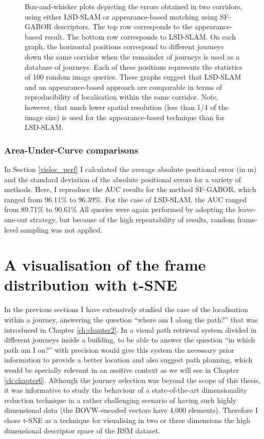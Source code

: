 \begin{figure}
\caption{Box-and-whisker plots depicting the errors obtained in two corridors, using either LSD-SLAM or appearance-based matching using SF-GABOR descriptors. The top row corresponds to the appearance-based result. The bottom row corresponds to LSD-SLAM. On each graph, the horizontal positions correspond to different journeys down the same corridor when the remainder of journeys is used as a database of journeys. Each of these positions represents the statistics of 100 random image queries. These graphs suggest that LSD-SLAM and an appearance-based approach are comparable in terms of reproducibility of localisation within the same corridor. Note, however, that much lower spatial resolution (less than 1/4 of the image size) is used for the appearance-based technique than for LSD-SLAM.}
\label{fig:reprod}
\end{figure}

\subsubsection{Area-Under-Curve comparisons}
In Section \ref{visloc_perf} I calculated the average absolute positional error (in m) and the standard deviation of the absolute positional errors for a variety of methods. Here, I reproduce the AUC results for the method SF-GABOR, which ranged from 96.11\% to 96.39\%. For the case of LSD-SLAM, the AUC ranged from 89.71\% to 90.61\% All queries were again performed by adopting the leave-one-out strategy, but because of the high repeatability of results, random frame-level sampling was not applied.  



\section{A visualisation of the frame distribution with t-SNE}

In the previous sections I have extensively studied the case of the localisation within a journey, answering the question ``where am I along the path?'' that was introduced in Chapter \ref{ch:chapter2}. In a visual path retrieval system divided in different journeys inside a building, to be able to answer the question ``in which path am I on?'' with precision would give this system the necessary prior information to provide a better location and also suggest path planning, which would be specially relevant in an assitive context as we will see in Chapter \ref{ch:chapter6}. Although the journey selection was beyond the scope of this thesis, it was informative to study the behaviour of a state-of-the-art dimensionality reduction technique in a rather challenging scenario of having such highly dimensional data (the BOVW-encoded vectors have 4,000 elements). Therefore I chose t-SNE as a technique for visualising in two or three dimensions the high dimensional descriptor space of the RSM dataset.

